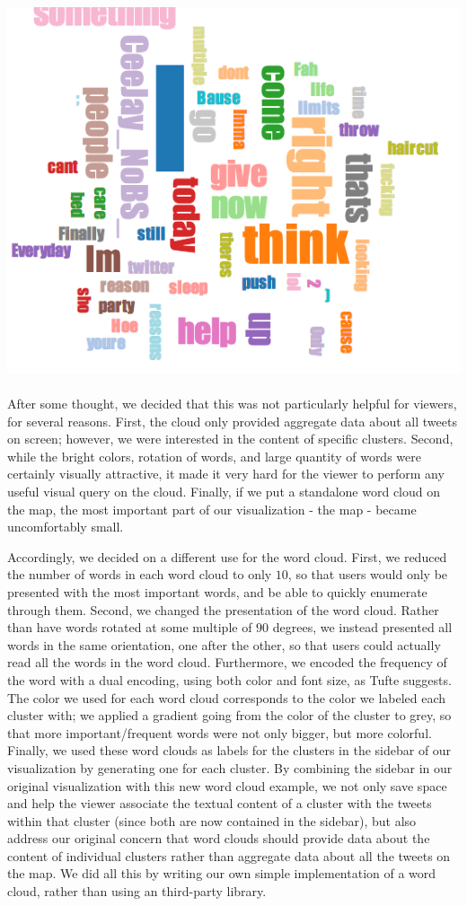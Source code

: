 \documentclass[pdftex,12pt,a4paper]{article}
\begin{document}
\includegraphics[width=5.5in]{cloud1.png} \\ \\
After some thought, we decided that this was not particularly helpful for viewers, for several reasons. First, the cloud only provided aggregate data about all tweets on screen; however, we were interested in the content of specific clusters. Second, while the bright colors, rotation of words, and large quantity of words were certainly visually attractive, it made it very hard for the viewer to perform any useful visual query on the cloud. Finally, if we put a standalone word cloud on the map, the most important part of our visualization - the map - became uncomfortably small.

Accordingly, we decided on a different use for the word cloud. First, we reduced the number of words in each word cloud to only $10$, so that users would only be presented with the most important words, and be able to quickly enumerate through them. Second, we changed the presentation of the word cloud. Rather than have words rotated at some multiple of $90$ degrees, we instead presented all words in the same orientation, one after the other, so that users could actually read all the words in the word cloud. Furthermore, we encoded the frequency of the word with a dual encoding, using both color and font size, as Tufte suggests. The color we used for each word cloud corresponds to the color we labeled each cluster with; we applied a gradient going from the color of the cluster to grey, so that more important/frequent words were not only bigger, but more colorful. Finally, we used these word clouds as labels for the clusters in the sidebar of our visualization by generating one for each cluster. By combining the sidebar in our original visualization with this new word cloud example, we not only save space and help the viewer associate the textual content of a cluster with the tweets within that cluster (since both are now contained in the sidebar), but also address our original concern that word clouds should provide data about the content of individual clusters rather than aggregate data about all the tweets on the map. We did all this by writing our own simple implementation of a word cloud, rather than using an third-party library. 
\end{document}
